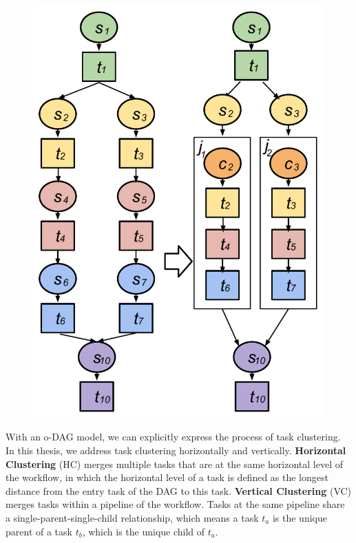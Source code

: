 \begin{figure}[!htb]
\centering
 \includegraphics[width=0.5\linewidth]{figures/model/vc.pdf}
  \label{fig:model_vc}
\end{figure}



With an o-DAG model, we can explicitly express the process of task clustering. In this thesis, we address task clustering horizontally and vertically. \textbf{Horizontal Clustering} (HC) merges multiple tasks that are at the same horizontal level of the workflow, in which the horizontal level of a task is defined as the longest distance from the entry task of the DAG to this task. \textbf{Vertical Clustering} (VC) merges tasks within a pipeline of the workflow. Tasks at the same pipeline share a single-parent-single-child relationship, which means a task $t_a$ is the unique parent of a task $t_b$, which is the unique child of $t_a$. 


